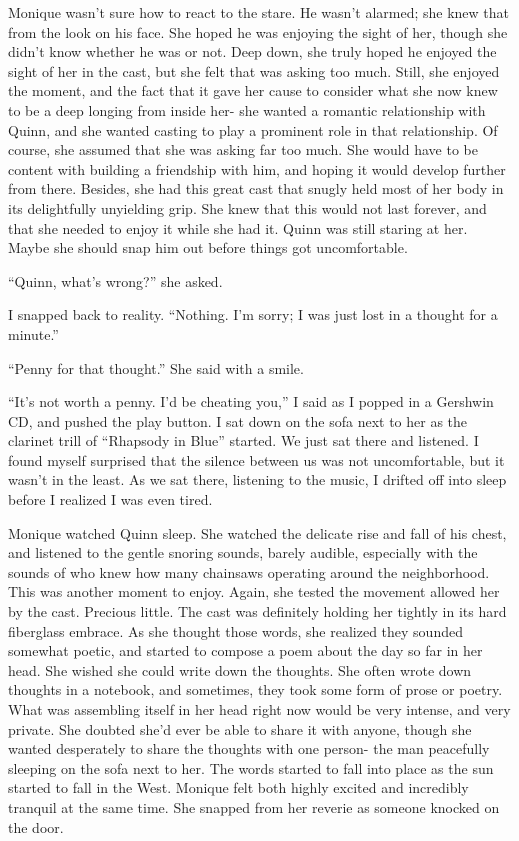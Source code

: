 \begin{thought}
Monique wasn't sure how to react to the stare. He wasn't alarmed; she knew that from the
look on his face. She hoped he was enjoying the sight of her, though she didn't know whether he
was or not. Deep down, she truly hoped he enjoyed the sight of her in the cast, but she felt
that was asking too much. Still, she enjoyed the moment, and the fact that it gave her cause to
consider what she now knew to be a deep longing from inside her- she wanted a romantic
relationship with Quinn, and she wanted casting to play a prominent role in that relationship.
Of course, she assumed that she was asking far too much. She would have to be content with
building a friendship with him, and hoping it would develop further from there. Besides, she had
this great cast that snugly held most of her body in its delightfully unyielding grip. She knew
that this would not last forever, and that she needed to enjoy it while she had it. Quinn was
still staring at her. Maybe she should snap him out before things got uncomfortable.
\end{thought}

``Quinn, what's wrong?'' she asked.

I snapped back to reality. ``Nothing. I'm sorry; I was just lost in a thought for a
minute.''

``Penny for that thought.'' She said with a smile.

``It's not worth a penny. I'd be cheating you,'' I said as I popped in a Gershwin CD, and
pushed the play button. I sat down on the sofa next to her as the clarinet trill of ``Rhapsody
in Blue'' started. We just sat there and listened. I found myself surprised that the silence
between us was not uncomfortable, but it wasn't in the least. As we sat there, listening to the
music, I drifted off into sleep before I realized I was even tired.

\begin{thought}
Monique watched Quinn sleep. She watched the delicate rise and fall of his chest, and
listened to the gentle snoring sounds, barely audible, especially with the sounds of who knew
how many chainsaws operating around the neighborhood. This was another moment to enjoy. Again,
she tested the movement allowed her by the cast. Precious little. The cast was definitely
holding her tightly in its hard fiberglass embrace. As she thought those words, she realized
they sounded somewhat poetic, and started to compose a poem about the day so far in her head.
She wished she could write down the thoughts. She often wrote down thoughts in a notebook, and
sometimes, they took some form of prose or poetry. What was assembling itself in her head right
now would be very intense, and very private. She doubted she'd ever be able to share it with
anyone, though she wanted desperately to share the thoughts with one person- the man peacefully
sleeping on the sofa next to her. The words started to fall into place as the sun started to
fall in the West. Monique felt both highly excited and incredibly tranquil at the same time. She
snapped from her reverie as someone knocked on the door.
\end{thought}

